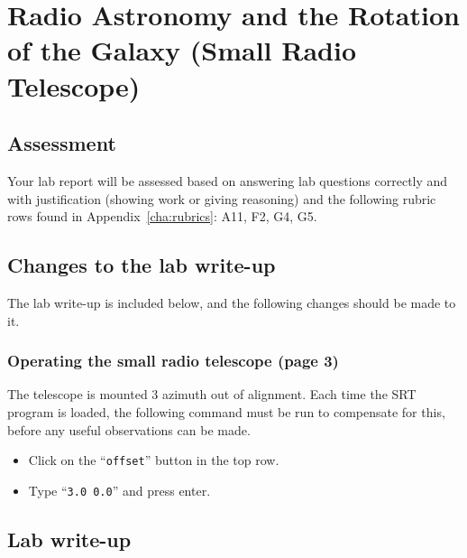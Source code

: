 \chapter{Radio Astronomy and the Rotation of the Galaxy (Small Radio Telescope)}


\section{Assessment}

Your lab report will be assessed based on answering lab questions correctly and with justification (showing work or giving reasoning) and the following rubric rows found in Appendix~\ref{cha:rubrics}: A11, F2, G4, G5.

\section{Changes to the lab write-up}

The lab write-up is included below, and the following changes should be made to it.

\subsection{Operating the small radio telescope (page 3)}

The telescope is mounted 3\textdegree{} azimuth out of alignment. Each time the SRT program is loaded, the following command must be run to compensate for this, before any useful observations can be made.

\begin{itemize}
	\item Click on the ``\texttt{offset}'' button in the top row.
	
	\item Type ``\texttt{3.0 0.0}'' and press enter.
\end{itemize}

\section{Lab write-up}

